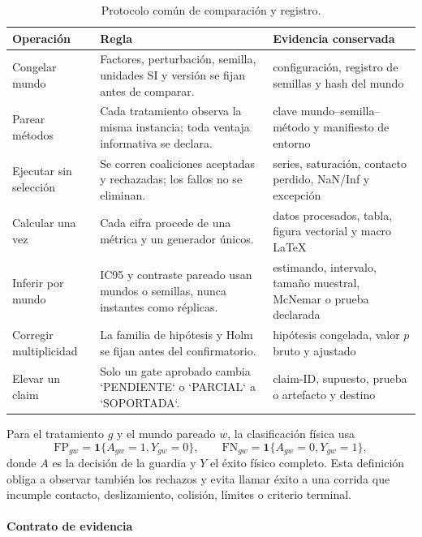 \begin{table}[!htbp]
  \centering
  \caption{Protocolo común de comparación y registro.}
  \label{tab:pre-results-protocol}
  \viutablefont
  \renewcommand{\arraystretch}{1.12}
  \begin{tabularx}{0.96\textwidth}{>{\raggedright\arraybackslash}p{2.55cm} Y >{\raggedright\arraybackslash}p{3.40cm}}
    \toprule
    Operación & Regla & Evidencia conservada \\
    \midrule
    Congelar mundo & Factores, perturbación, semilla, unidades SI y versión se fijan antes de comparar. & configuración, registro de semillas y hash del mundo \\
    Parear métodos & Cada tratamiento observa la misma instancia; toda ventaja informativa se declara. & clave mundo--semilla--método y manifiesto de entorno \\
    Ejecutar sin selección & Se corren coaliciones aceptadas y rechazadas; los fallos no se eliminan. & series, saturación, contacto perdido, NaN/Inf y excepción \\
    Calcular una vez & Cada cifra procede de una métrica y un generador únicos. & datos procesados, tabla, figura vectorial y macro LaTeX \\
    Inferir por mundo & IC95 y contraste pareado usan mundos o semillas, nunca instantes como réplicas. & estimando, intervalo, tamaño muestral, McNemar o prueba declarada \\
    Corregir multiplicidad & La familia de hipótesis y Holm se fijan antes del confirmatorio. & hipótesis congelada, valor $p$ bruto y ajustado \\
    Elevar un claim & Solo un gate aprobado cambia `PENDIENTE` o `PARCIAL` a `SOPORTADA`. & claim-ID, supuesto, prueba o artefacto y destino \\
    \bottomrule
  \end{tabularx}
  \viuownsource
\end{table}

Para el tratamiento $g$ y el mundo pareado $w$, la clasificación física usa
\[
 \mathrm{FP}_{gw}=\mathbf1\{A_{gw}=1,Y_{gw}=0\},\qquad
 \mathrm{FN}_{gw}=\mathbf1\{A_{gw}=0,Y_{gw}=1\},
\]
donde $A$ es la decisión de la guardia y $Y$ el éxito físico completo. Esta definición obliga a observar también los rechazos y evita llamar éxito a una corrida que incumple contacto, deslizamiento, colisión, límites o criterio terminal.

\clearpage
\paragraph{Contrato de evidencia}

